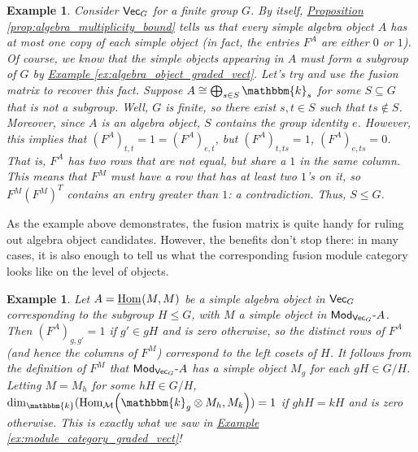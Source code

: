 \documentclass[12pt, reqno]{amsart}
\numberwithin{equation}{section}
\theoremstyle{plainspace}
\theoremstyle{definitionspace}
\newtheorem{example}[theorem]{Example}
\theoremstyle{remarkspace}
\newcommand{\mathcat}[1]{\mathcal{#1}}
\newcommand{\Hom}[2][]{
	\ifthenelse{\equal{#2}{}}
		{\textup{Hom}_{#1}}
		{\textup{Hom}_{#1}\!\left(#2\right)}
}
\newcommand{\IntHom}[2][]{
	\ifthenelse{\equal{#2}{}}
		{\underline{\textup{Hom}}_{#1}}
		{\underline{\textup{Hom}}_{#1}\!\left(#2\right)}
}
\newcommand{\textcat}[1]{\textup{\textsf{#1}}}
\newcommand{\rmodcat}[2][]{\textcat{Mod}_{#1}\textcat{-}#2}
\begin{document}
\begin{example}\label{ex:fusion_matrix_graded_vect_candidates}
Consider $\textcat{Vec}_G$ for a finite group $G$. By itself, \hyperref[prop:algebra_multiplicity_bound]{Proposition \ref*{prop:algebra_multiplicity_bound}} tells us that every simple algebra object $A$ has at most one copy of each simple object (in fact, the entries $F^A$ are either $0$ or $1$). Of course, we know that the simple objects appearing in $A$ must form a subgroup of $G$ by \hyperref[ex:algebra_object_graded_vect]{Example \ref*{ex:algebra_object_graded_vect}}. Let's try and use the fusion matrix to recover this fact. Suppose $A \cong \bigoplus_{s \in S}{\mathbbm{k}_s}$ for some $S \subseteq G$ that is not a subgroup. Well, $G$ is finite, so there exist $s, t \in S$ such that $ts \notin S$. Moreover, since $A$ is an algebra object, $S$ contains the group identity $e$. However, this implies that $(F^A)_{t,t} = 1 = (F^A)_{e,t}$, but $(F^A)_{t,ts} = 1$, $(F^A)_{e,ts} = 0$. That is, $F^A$ has two rows that are not equal, but share a $1$ in the same column. This means that $F^M$ must have a row that has at least two $1$'s on it, so $F^M (F^M)^T$ contains an entry greater than $1$: a contradiction. Thus, $S \leq G$.
\end{example}
\leavevmode

\noindent As the example above demonstrates, the fusion matrix is quite handy for ruling out algebra object candidates. However, the benefits don't stop there: in many cases, it is also enough to tell us what the corresponding fusion module category looks like on the level of objects.
\newline

\begin{example}\label{ex:fusion_matrix_graded_vect_modules}
Let $A = \IntHom{M, M}$ be a simple algebra object in $\textcat{Vec}_G$ corresponding to the subgroup $H \leq G$, with $M$ a simple object in $\rmodcat[\textcat{Vec}_G]{A}$. Then $(F^A)_{g,g'} = 1$ if $g' \in gH$ and is zero otherwise, so the distinct rows of $F^A$ (and hence the columns of $F^M$) correspond to the left cosets of $H$. It follows from the definition of $F^M$ that $\rmodcat[\textcat{Vec}_G]{A}$ has a simple object $M_g$ for each $gH \in G/H$. Letting $M = M_h$ for some $hH \in G/H$, $\dim_{\mathbbm{k}}(\Hom[\mathcat{M}]{\mathbbm{k}_g \otimes M_h, M_k}) = 1$ if $ghH = kH$ and is zero otherwise. This is exactly what we saw in \hyperref[ex:module_category_graded_vect]{Example \ref*{ex:module_category_graded_vect}}!
\end{example}
\newpage
\end{document}
